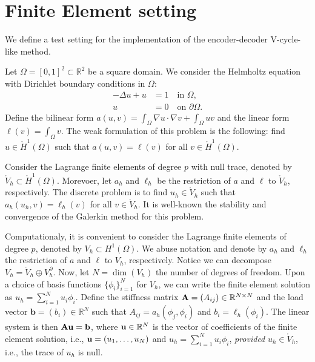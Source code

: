 \section{Finite Element setting}
\label{sec:fem}

We define a test setting for the implementation of the encoder-decoder V-cycle-like method.

Let $\Omega = [0,1]^2 \subset \mathbb{R}^2$ be a square domain.
We consider the Helmholtz equation with Dirichlet boundary conditions in $\Omega$:
\begin{subequations}
    \begin{align}
        -\Delta u + u &= 1 \quad \text{in } \Omega, \\
        u &= 0 \quad \text{on } \partial \Omega.
    \end{align}
\end{subequations}
Define the bilinear form \(a(u,v) = \int_{\Omega} \nabla u \cdot \nabla v + \int_{\Omega} uv\) and the linear form \(\ell(v) = \int_{\Omega} v\).
The weak formulation of this problem is the following:
find \(u \in \mathring{H}^1(\Omega)\) such that \(a(u,v) = \ell(v)\) for all \(v \in \mathring{H}^1(\Omega)\).

Consider the Lagrange finite elements of degree \(p\) with null trace, denoted by \(\mathring{V}_h \subset \mathring{H}^1(\Omega)\).
Morevoer, let \(a_h\) and \(\ell_h\) be the restriction of \(a\) and \(\ell\) to \(\mathring{V}_h\), respectively.
The discrete problem is to find \(u_h \in \mathring{V}_h\) such that \(a_h(u_h,v) = \ell_h(v)\) for all \(v \in \mathring{V}_h\).
It is well-known the stability and convergence of the Galerkin method for this problem.

Computationaly, it is convenient to consider the Lagrange finite elements of degree \(p\), denoted by \(V_h \subset H^1(\Omega)\).
We abuse notation and denote by \(a_h\) and \(\ell_h\) the restriction of \(a\) and \(\ell\) to \(V_h\), respectively.
Notice we can decompose \(V_h = \mathring{V}_h \oplus V_h^\partial\).
Now, let \( N = \dim(V_h) \) the number of degrees of freedom.
Upon a choice of basis functions \( \{ \phi_i \}_{i=1}^{N} \) for \(V_h\), we can write the finite element solution as \(u_h = \sum_{i=1}^{N} u_i \phi_i\).
Define the stiffness matrix \(\mathbf{A} = (A_{ij}) \in \mathbb{R}^{N \times N}\) and the load vector \(\mathbf{b} = (b_i) \in \mathbb{R}^{N}\) such that \(A_{ij} = a_h(\phi_j, \phi_i)\) and \(b_i = \ell_h(\phi_i)\).
The linear system is then \(\mathbf{A} \mathbf{u} = \mathbf{b}\), where \(\mathbf{u} \in \mathbb{R}^{N}\) is the vector of coefficients of the finite element solution, i.e., \(\mathbf{u} = (u_1, \ldots, u_N)\) and \(u_h = \sum_{i=1}^{N} u_i \phi_i\), \emph{provided} \(u_h \in \mathring{V}_h\), i.e., the trace of \(u_h\) is null.

